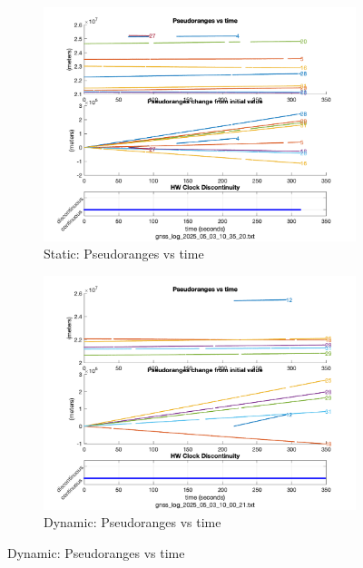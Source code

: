         \begin{figure}[h!]
            \centering
            \begin{subfigure}{0.23\textwidth}
                \includegraphics[width=\textwidth]{images/tests/Monte_Cappuccini/png/Samsung_A51_Monte_Cappuccini_fig1.png}
                \caption{Static: Pseudoranges vs time}
            \end{subfigure}
            \hfill
            \begin{subfigure}{0.23\textwidth}
                \includegraphics[width=\textwidth]{images/tests/Tram_15_trip_Castello_to_Pescatore/png/Samsung_A51_Tram_15_trip_Castello_to_Pescatore_fig1.png}
                \caption{Dynamic: Pseudoranges vs time}
            \end{subfigure}
        \end{figure}
    
